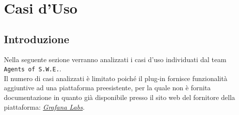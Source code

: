 \section{Casi d'Uso}\label{CasiUso}
\subsection{Introduzione}\label{CasiUso_Introduzione}
Nella seguente sezione verranno analizzati i casi d'uso individuati dal team \texttt{Agents of S.W.E.}.\\
Il numero di casi analizzati è limitato poiché il plug-in fornisce funzionalità aggiuntive ad una piattaforma preesistente, per la quale non è fornita documentazione in quanto già disponibile presso il sito web del fornitore della piattaforma: \href{http://docs.grafana.org/}{\textit{Grafana Labs}}.\\